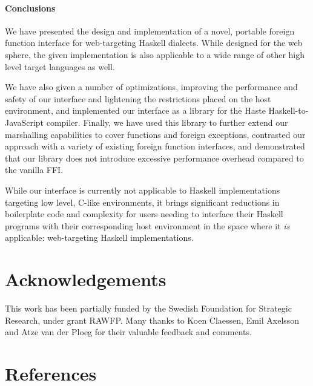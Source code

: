 \documentclass{sigplanconf}
\begin{document}
\paragraph{Conclusions}
We have presented the design and implementation of a novel,
\linebreak
portable foreign
function interface for web-targeting Haskell dialects. While designed for the
web sphere, the given implementation is also applicable to a wide range of
other high level target languages as well.

We have also given a number of optimizations, improving the performance and
safety of our interface
and lightening the restrictions placed on the host environment, and implemented
our interface as a library for the Haste Haskell-to-JavaScript compiler.
Finally, we have used this library to further extend our marshalling
capabilities to cover functions and foreign exceptions, contrasted our approach
with a variety of existing foreign function interfaces, and demonstrated that
our library does not introduce excessive performance overhead compared to
the vanilla FFI.

While our interface is currently not applicable to Haskell implementations
targeting low level, C-like environments, it brings significant reductions in
boilerplate code and complexity for users needing to interface their Haskell
programs with their corresponding host environment in the space where it
\emph{is} applicable: web-targeting Haskell implementations.

\section{Acknowledgements}
This work has been partially funded by the Swedish Foundation for Strategic Research, under grant RAWFP. Many thanks to Koen Claessen, Emil Axelsson and Atze van der Ploeg for their valuable feedback and comments.

\section{References}
\renewcommand\refname{}


\end{document}
